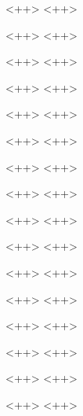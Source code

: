 \documentclass[final]{beamer}
\begin{document}
\begin{frame}{<++>}
<++>
\end{frame}

\begin{frame}{<++>}
<++>
\end{frame}

\begin{frame}{<++>}
<++>
\end{frame}

\begin{frame}{<++>}
<++>
\end{frame}

\begin{frame}{<++>}
<++>
\end{frame}

\begin{frame}{<++>}
<++>
\end{frame}

\begin{frame}{<++>}
<++>
\end{frame}

\begin{frame}{<++>}
<++>
\end{frame}

\begin{frame}{<++>}
<++>
\end{frame}

\begin{frame}{<++>}
<++>
\end{frame}

\begin{frame}{<++>}
<++>
\end{frame}

\begin{frame}{<++>}
<++>
\end{frame}

\begin{frame}{<++>}
<++>
\end{frame}

\begin{frame}{<++>}
<++>
\end{frame}

\begin{frame}{<++>}
<++>
\end{frame}

\begin{frame}{<++>}
<++>
\end{frame}
\end{document}
